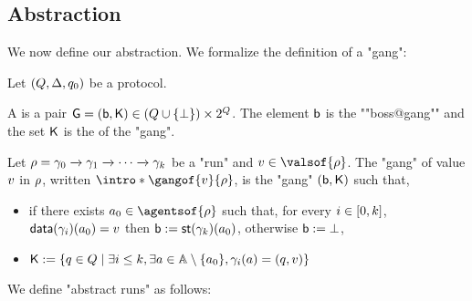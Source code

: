 \subsection{Abstraction}

We now define our abstraction. We formalize the definition of a "gang":

\begin{definition}
	Let $(Q,\Delta, q_0)$ be a protocol.
	
	A  is a pair $\mathsf{G} = (\mathsf{b}, \mathsf{K}) \in (Q \cup \{\bot\}) \times 2^{Q}$. The element $\mathsf{b}$ is the ""boss@gang"" and the set $\mathsf{K}$ is the  of the "gang". 
	
	Let $\rho = \gamma_0 \xrightarrow{} \gamma_1 \xrightarrow{} \cdots \xrightarrow{} \gamma_k$ be a "run" and $\aval \in \valsof{\run}$. The "gang" of value $v$ in $\rho$, written $\intro*\gangof{\aval}{\run}$, is the "gang" $(\mathsf{b}, \mathsf{K})$ such that, 
	\begin{itemize}
		\item if there exists $a_0 \in \agentsof{\run}$ such that, 
		for every 
		$i \in [0,k]$, 
		$\mathsf{data}(\gamma_i)(a_0) = v$ then $\mathsf{b} := \mathsf{st}(\gamma_k)(a_0)$, otherwise $\mathsf{b} := \bot$, 
		\item  $\mathsf{K} := \{q \in Q \mid \exists i \leq k, \exists a \in \mathbb{A}\setminus \{a_0\}, \gamma_i(a) = (q,v)\}$
	\end{itemize}
\end{definition} 


We define "abstract runs" as follows:
 
